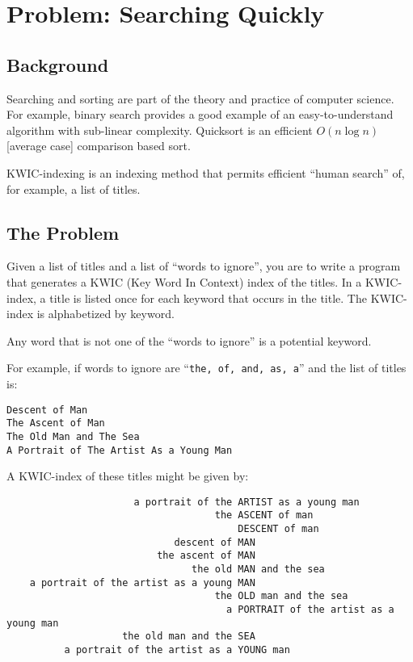\clearpage

\section{Problem: Searching Quickly}

\subsection*{Background}

Searching and sorting are part of the theory and practice of computer
science.  For example, binary search provides a good example of an
easy-to-understand algorithm with sub-linear complexity.  Quicksort is
an efficient $O(n \log n)$ [average case] comparison based sort.

KWIC-indexing is an indexing method that permits efficient ``human
search'' of, for example, a list of titles.

\subsection*{The Problem}
Given a list of titles and a list of ``words to ignore'', you are to
write a program that generates a KWIC (Key Word In Context) index of the
titles.  In a KWIC-index, a title is listed once for each keyword that
occurs in the title.  The KWIC-index is alphabetized by keyword.  

Any word that is not one of the ``words to ignore'' is a potential
keyword.


For example, if words to ignore are
``\verb!the, of, and, as, a!'' and the list
of titles is:
{\small\begin{verbatim}
Descent of Man
The Ascent of Man
The Old Man and The Sea
A Portrait of The Artist As a Young Man
\end{verbatim}}

A KWIC-index of these titles might be given by:

{\small\begin{verbatim}
                      a portrait of the ARTIST as a young man 
                                    the ASCENT of man 
                                        DESCENT of man 
                             descent of MAN 
                          the ascent of MAN 
                                the old MAN and the sea 
    a portrait of the artist as a young MAN 
                                    the OLD man and the sea 
                                      a PORTRAIT of the artist as a young man 
                    the old man and the SEA 
          a portrait of the artist as a YOUNG man 
\end{verbatim}}

